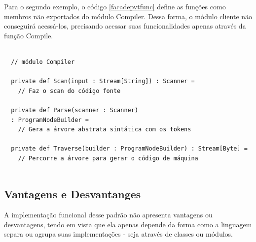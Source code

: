 Para o segundo exemplo, o código \ref{facadepvtfunc} define 
as funções como membros não exportados do módulo Compiler. 
Dessa forma, o módulo cliente não conseguirá acessá-los, 
precisando acessar suas funcionalidades apenas através da 
função Compile.

\begin{lstlisting}[caption={Função de acesso Compile},label=facadepvtfunc]
    
  // módulo Compiler    

  private def Scan(input : Stream[String]) : Scanner = 
    // Faz o scan do código fonte

  private def Parse(scanner : Scanner)
  : ProgramNodeBuilder = 
    // Gera a árvore abstrata sintática com os tokens

  private def Traverse(builder : ProgramNodeBuilder) : Stream[Byte] = 
    // Percorre a árvore para gerar o código de máquina
    
\end{lstlisting}

\subsection*{Vantagens e Desvantanges}

A implementação funcional desse padrão não apresenta 
vantagens ou desvantagens, tendo em vista que ela apenas 
depende da forma como a linguagem separa ou agrupa 
suas implementações - seja através de classes ou módulos. 